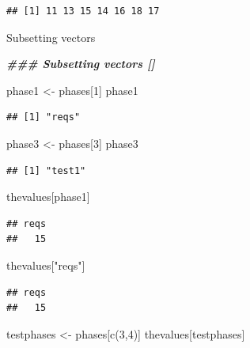 \documentclass[
]{book}
\newenvironment{Shaded}{\begin{snugshade}}{\end{snugshade}}
\newcommand{\DecValTok}[1]{\textcolor[rgb]{0.00,0.00,0.81}{#1}}
\newcommand{\DocumentationTok}[1]{\textcolor[rgb]{0.56,0.35,0.01}{\textbf{\textit{#1}}}}
\newcommand{\FunctionTok}[1]{\textcolor[rgb]{0.00,0.00,0.00}{#1}}
\newcommand{\NormalTok}[1]{#1}
\newcommand{\OtherTok}[1]{\textcolor[rgb]{0.56,0.35,0.01}{#1}}
\newcommand{\StringTok}[1]{\textcolor[rgb]{0.31,0.60,0.02}{#1}}
\begin{document}
\begin{verbatim}
## [1] 11 13 15 14 16 18 17
\end{verbatim}

Subsetting vectors

\begin{Shaded}
\begin{Highlighting}[]
\DocumentationTok{\#\#\# Subsetting vectors  []}

\NormalTok{phase1 }\OtherTok{\textless{}{-}}\NormalTok{ phases[}\DecValTok{1}\NormalTok{]}
\NormalTok{phase1}
\end{Highlighting}
\end{Shaded}

\begin{verbatim}
## [1] "reqs"
\end{verbatim}

\begin{Shaded}
\begin{Highlighting}[]
\NormalTok{phase3 }\OtherTok{\textless{}{-}}\NormalTok{ phases[}\DecValTok{3}\NormalTok{]}
\NormalTok{phase3}
\end{Highlighting}
\end{Shaded}

\begin{verbatim}
## [1] "test1"
\end{verbatim}

\begin{Shaded}
\begin{Highlighting}[]
\NormalTok{thevalues[phase1]}
\end{Highlighting}
\end{Shaded}

\begin{verbatim}
## reqs 
##   15
\end{verbatim}

\begin{Shaded}
\begin{Highlighting}[]
\NormalTok{thevalues[}\StringTok{"reqs"}\NormalTok{]}
\end{Highlighting}
\end{Shaded}

\begin{verbatim}
## reqs 
##   15
\end{verbatim}

\begin{Shaded}
\begin{Highlighting}[]
\NormalTok{testphases }\OtherTok{\textless{}{-}}\NormalTok{ phases[}\FunctionTok{c}\NormalTok{(}\DecValTok{3}\NormalTok{,}\DecValTok{4}\NormalTok{)]}
\NormalTok{thevalues[testphases]}
\end{Highlighting}
\end{Shaded}
\end{document}

